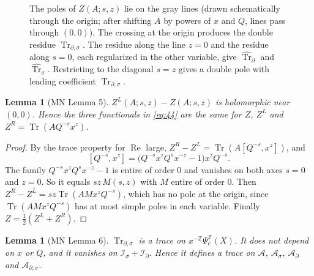 \documentclass[11pt,oneside,reqno]{article}
\DeclareMathOperator{\Tr}{Tr}
\newcommand{\Z}{\mathbb Z}
\newcommand{\cA}{\mathcal A}
\newcommand{\Is}{\mathcal I_\sigma}
\newcommand{\Id}{\mathcal I_\partial}
\newcommand{\As}{\mathcal A_\sigma}
\newcommand{\Ad}{\mathcal A_\partial}
\newcommand{\Ads}{\mathcal A_{\partial,\sigma}}
\newcommand{\Psic}{\Psi_{c}}
\newcommand{\Trds}{\Tr_{\partial,\sigma}}
\newcommand{\hTrs}{\widehat{\Tr}_\sigma}
\newcommand{\hTrd}{\widehat{\Tr}_\partial}
\theoremstyle{plain}
\newtheorem{lemma}[theorem]{Lemma}
\theoremstyle{definition}
\theoremstyle{remark}
\begin{document}
\begin{figure}[htbp]
\centering
{}
\caption[Poles of the double zeta function]{The poles of \(Z(A;s,z)\) lie
on the gray lines (drawn schematically through the origin; after shifting
\(A\) by powers of \(x\) and \(Q\), lines pass through \((0,0)\)). The
crossing at the origin produces the double residue \(\Trds\). The residue
along the line \(z=0\) and the residue along \(s=0\), each regularized in
the other variable, give \(\hTrd\) and \(\hTrs\). Restricting to the
diagonal \(s=z\) gives a double pole with leading coefficient \(\Trds\).}
\label{fig:poles}
\end{figure}

\begin{lemma}[MN Lemma 5]\label{lem:LR}
\(Z^L(A;s,z)-Z(A;s,z)\) is holomorphic near \((0,0)\). Hence the three
functionals in \eqref{eq:44} are the same for \(Z\), \(Z^L\) and
\(Z^R=\Tr(AQ^{-s}x^z)\).
\end{lemma}

\begin{proof}
By the trace property for \(\operatorname{Re}\) large,
\(Z^R-Z^L=\Tr(A[Q^{-s},x^z])\), and
\[
 [Q^{-s},x^z]=\bigl(Q^{-s}x^zQ^sx^{-z}-1\bigr)x^zQ^{-s}.
\]
The family \(Q^{-s}x^zQ^sx^{-z}-1\) is entire of order \(0\) and vanishes
on both axes \(s=0\) and \(z=0\). So it equals \(sz\,M(s,z)\) with \(M\)
entire of order \(0\). Then \(Z^R-Z^L=sz\Tr(AMx^zQ^{-s})\), which has no
pole at the origin, since \(\Tr(AMx^zQ^{-s})\) has at most simple poles in
each variable. Finally \(Z=\frac12(Z^L+Z^R)\).
\end{proof}

\begin{lemma}[MN Lemma 6]\label{lem:Trds}
\(\Trds\) is a trace on \(x^{-\Z}\Psic^{\Z}(X)\). It does not depend on
\(x\) or \(Q\), and it vanishes on \(\Is+\Id\). Hence it defines a trace
on \(\cA\), \(\As\), \(\Ad\) and \(\Ads\).
\end{lemma}
\end{document}
